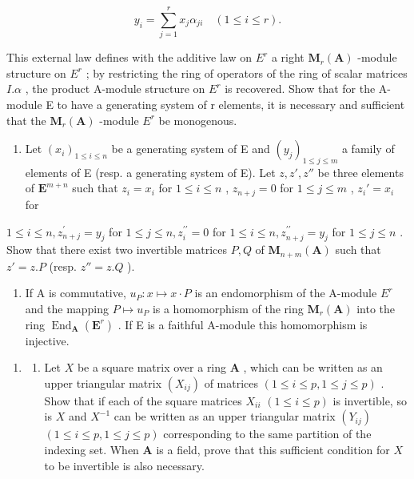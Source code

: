 \[
y _ {i} = \sum_ {j = 1} ^ {r} x _ {j} \alpha_ {j i} \quad (1 \leqslant i \leqslant r).
\]

This external law defines with the additive law on \(E^{r}\) a right \(\mathbf{M}_{r}(\mathbf{A})\) -module structure on \(E^{r}\) ; by restricting the ring of operators of the ring of scalar matrices \(I.\alpha\) , the product A-module structure on \(E^{r}\) is recovered. Show that for the A-module E to have a generating system of r elements, it is necessary and sufficient that the \(\mathbf{M}_{r}(\mathbf{A})\) -module \(E^{r}\) be monogenous.

\begin{enumerate}
\def\labelenumi{(\alph{enumi})}
\setcounter{enumi}{1}
\tightlist
\item
  Let \((x_{i})_{1\leqslant i\leqslant n}\) be a generating system of E and \((y_{j})_{1\leqslant j\leqslant m}\) a family of elements of E (resp. a generating system of E). Let \(z, z', z''\) be three elements of \(\mathbf{E}^{m + n}\) such that \(z_{i} = x_{i}\) for \(1\leqslant i\leqslant n\) , \(z_{n + j} = 0\) for \(1\leqslant j\leqslant m\) , \(z_{i}' = x_{i}\) for
\end{enumerate}

\(1 \leqslant i \leqslant n, z_{n+j}^{\prime} = y_{j}\) for \(1 \leqslant j \leqslant n, z_{i}^{\prime \prime} = 0\) for \(1 \leqslant i \leqslant n, z_{n+j}^{\prime \prime} = y_{j}\) for \(1 \leqslant j \leqslant n\) . Show that there exist two invertible matrices \(P, Q\) of \(\mathbf{M}_{n+m}(\mathbf{A})\) such that \(z' = z.P\) (resp. \(z'' = z.Q\) ).

\begin{enumerate}
\def\labelenumi{(\alph{enumi})}
\setcounter{enumi}{2}
\tightlist
\item
  If A is commutative, \(u_{P}: x \mapsto x \cdot P\) is an endomorphism of the A-module \(E^{r}\) and the mapping \(P \mapsto u_{P}\) is a homomorphism of the ring \(\mathbf{M}_{r}(\mathbf{A})\) into the ring \(\operatorname{End}_{\mathbf{A}}(\mathbf{E}^{r})\) . If E is a faithful A-module this homomorphism is injective.
\end{enumerate}

\begin{enumerate}
\def\labelenumi{\arabic{enumi}.}
\setcounter{enumi}{1}
\tightlist
\item
  \begin{enumerate}
  \def\labelenumii{(\alph{enumii})}
  \tightlist
  \item
    Let \(X\) be a square matrix over a ring \(\mathbf{A}\) , which can be written as an upper triangular matrix \((X_{ij})\) of matrices \((1 \leqslant i \leqslant p, 1 \leqslant j \leqslant p)\) . Show that if each of the square matrices \(X_{ii}\) \((1 \leqslant i \leqslant p)\) is invertible, so is \(X\) and \(X^{-1}\) can be written as an upper triangular matrix \((Y_{ij})\) \((1 \leqslant i \leqslant p, 1 \leqslant j \leqslant p)\) corresponding to the same partition of the indexing set. When \(\mathbf{A}\) is a field, prove that this sufficient condition for \(X\) to be invertible is also necessary.
  \end{enumerate}
\end{enumerate}

